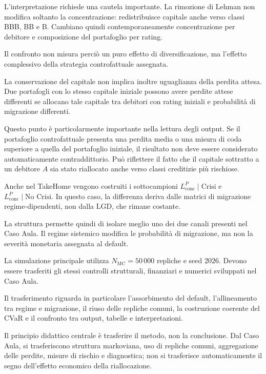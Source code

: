 L'interpretazione richiede una cautela importante. La rimozione di Lehman
non modifica soltanto la concentrazione: redistribuisce capitale anche verso
classi BBB, BB e B. Cambiano quindi contemporaneamente concentrazione per
debitore e composizione del portafoglio per rating.

Il confronto non misura perci\`o un puro effetto di diversificazione, ma
l'effetto complessivo della strategia controfattuale assegnata.

La conservazione del capitale non implica inoltre uguaglianza della perdita
attesa. Due portafogli con lo stesso capitale iniziale possono avere perdite
attese differenti se allocano tale capitale tra debitori con rating iniziali
e probabilit\`a di migrazione differenti.

Questo punto \`e particolarmente importante nella lettura degli output. Se il
portafoglio controfattuale presenta una perdita media o una misura di coda
superiore a quella del portafoglio iniziale, il risultato non deve essere
considerato automaticamente contraddittorio. Pu\`o riflettere il fatto che il
capitale sottratto a un debitore $A$ sia stato riallocato anche verso classi
creditizie pi\`u rischiose.

Anche nel TakeHome vengono costruiti i sottocampioni
$L_{\mathrm{conc}}^P\mid\text{Crisi}$ e
$L_{\mathrm{conc}}^P\mid\text{No Crisi}$. In questo caso, la differenza
deriva dalle matrici di migrazione regime-dipendenti, non dalla $\mathrm{LGD}$, che
rimane costante.

La struttura permette quindi di isolare meglio uno dei due canali presenti
nel Caso Aula. Il regime sistemico modifica le probabilit\`a di migrazione,
ma non la severit\`a monetaria assegnata al default.

La simulazione principale utilizza $N_{\mathrm{MC}}=50\,000$ repliche e
seed $2026$. Devono essere trasferiti gli stessi controlli strutturali,
finanziari e numerici sviluppati nel Caso Aula.

Il trasferimento riguarda in particolare l'assorbimento del default,
l'allineamento tra regime e migrazione, il riuso delle repliche comuni, la
costruzione coerente del CVaR e il confronto tra output, tabelle e
interpretazioni.

Il principio didattico centrale \`e trasferire il metodo, non la conclusione.
Dal Caso Aula, si trasferiscono struttura markoviana, uso di repliche comuni,
aggregazione delle perdite, misure di rischio e diagnostica; non si trasferisce
automaticamente il segno dell'effetto economico della riallocazione.

